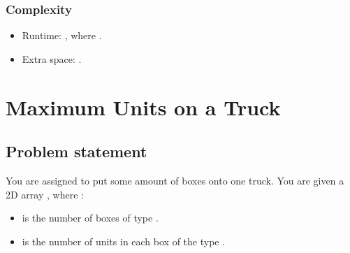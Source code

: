 \documentclass[letterpaper,12pt,english]{book}
\begin{document}
\subsubsection{Complexity}
\label{\detokenize{Mathematics/09_MTH_1689_Partitioning_Into_Minimum_Number_Of_Deci-Binary_Numbers:complexity}}\begin{itemize}
\item {} 
\sphinxAtStartPar
Runtime: , where .

\item {} 
\sphinxAtStartPar
Extra space: .

\end{itemize}

\sphinxstepscope


\section{Maximum Units on a Truck}
\label{\detokenize{Mathematics/09_MTH_1710_Maximum_Units_on_a_Truck:maximum-units-on-a-truck}}\label{\detokenize{Mathematics/09_MTH_1710_Maximum_Units_on_a_Truck::doc}}

\subsection{Problem statement\sphinxfootnotemark[116]}
\label{\detokenize{Mathematics/09_MTH_1710_Maximum_Units_on_a_Truck:problem-statement}}%
\begin{footnotetext}[116]\sphinxAtStartFootnote
{}
%
\end{footnotetext}\ignorespaces 
\sphinxAtStartPar
You are assigned to put some amount of boxes onto one truck. You are given a 2D array , where :
\begin{itemize}
\item {} 
\sphinxAtStartPar
{} is the number of boxes of type .

\item {} 
\sphinxAtStartPar
{} is the number of units in each box of the type .

\end{itemize}
\end{document}
